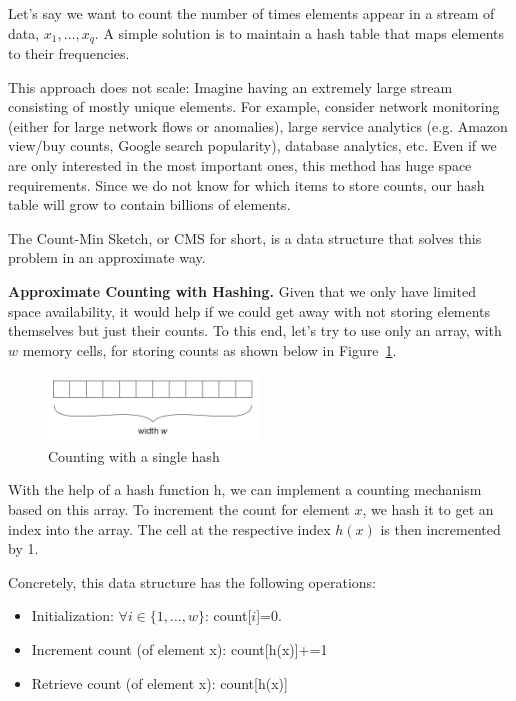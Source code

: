 \documentclass{hw}
\begin{document}
\newpage


\begin{problem}

Let’s say we want to count the number of times elements appear in a stream of data, $x_1, \dots, x_q$. A simple solution is to maintain a hash table that maps elements to their frequencies.

This approach does not scale: Imagine having an extremely large stream consisting of mostly unique elements. For example, consider network monitoring (either for large network flows or anomalies), large service analytics (e.g. Amazon view/buy counts, Google search popularity), database analytics, etc. Even if we are only interested in the most important ones, this method has huge space requirements. Since we do not know for which items to store counts, our hash table will grow to contain billions of elements.

The Count-Min Sketch, or CMS for short, is a data structure that solves this problem in an approximate way.

\textbf{Approximate Counting with Hashing.}
Given that we only have limited space availability, it would help if we could get away with not storing elements themselves but just their counts. To this end, let’s try to use only an array, with $w$ memory cells, for storing counts as shown below in Figure~\ref{fig:single-hash}.
\begin{figure}[H]
    \centering
    \includegraphics[width=0.5\textwidth]{figures/single_hash.png}
    \caption{Counting with a single hash}
    \label{fig:single-hash}
\end{figure}

With the help of a hash function h, we can implement a counting mechanism based on this array. To increment the count for element $x$, we hash it to get an index into the array. The cell at the respective index $h(x)$ is then incremented by 1.

Concretely, this data structure has the following operations:

\begin{itemize}
    \item Initialization: $\forall i \in \{1, \dots, w\}$: count[$i$]=0.
    \item Increment count (of element x): count[h(x)]+=1
    \item Retrieve count (of element x): count[h(x)]
\end{itemize}


\end{problem}
\end{document}
